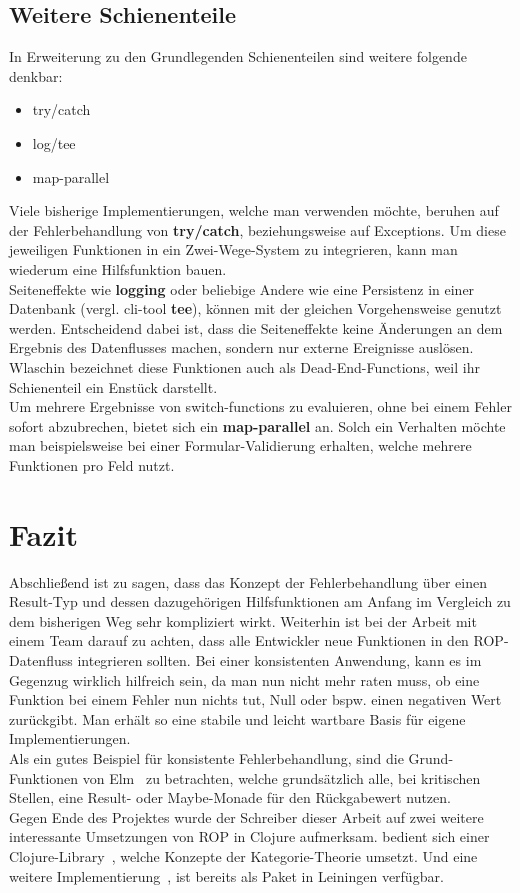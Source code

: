 \documentclass[10pt,journal,compsoc]{IEEEtran}
\begin{document}
  \subsection{Weitere Schienenteile}
  In Erweiterung zu den Grundlegenden Schienenteilen sind weitere folgende denkbar:
  \begin{itemize}
    \item try/catch
    \item log/tee
    \item map-parallel
  \end{itemize}
  Viele bisherige Implementierungen, welche man verwenden möchte, beruhen auf der Fehlerbehandlung von \textbf{try/catch}, beziehungsweise auf Exceptions.
  Um diese jeweiligen Funktionen in ein Zwei-Wege-System zu integrieren, kann man wiederum eine Hilfsfunktion bauen.\\
  Seiteneffekte wie \textbf{logging} oder beliebige Andere wie eine Persistenz in einer Datenbank (vergl. cli-tool \textbf{tee}), können mit der gleichen Vorgehensweise genutzt werden.
  Entscheidend dabei ist, dass die Seiteneffekte keine Änderungen an dem Ergebnis des Datenflusses machen, sondern nur externe Ereignisse auslösen.
  Wlaschin bezeichnet diese Funktionen auch als Dead-End-Functions, weil ihr Schienenteil ein Enstück darstellt.\\
  Um mehrere Ergebnisse von switch-functions zu evaluieren, ohne bei einem Fehler sofort abzubrechen, bietet sich ein \textbf{map-parallel} an.
  Solch ein Verhalten möchte man beispielsweise bei einer Formular-Validierung erhalten, welche mehrere Funktionen pro Feld nutzt.

  \section{Fazit}
  Abschließend ist zu sagen, dass das Konzept der Fehlerbehandlung über einen Result-Typ und dessen dazugehörigen Hilfsfunktionen am Anfang im Vergleich zu dem bisherigen Weg sehr kompliziert wirkt.
  Weiterhin ist bei der Arbeit mit einem Team darauf zu achten, dass alle Entwickler neue Funktionen in den ROP-Datenfluss integrieren sollten.
  Bei einer konsistenten Anwendung, kann es im Gegenzug wirklich hilfreich sein, da man nun nicht mehr raten muss, ob eine Funktion bei einem Fehler nun nichts tut, Null oder bspw. einen negativen Wert zurückgibt.
  Man erhält so eine stabile und leicht wartbare Basis für eigene Implementierungen.\\
  Als ein gutes Beispiel für konsistente Fehlerbehandlung, sind die Grund-Funktionen von Elm~\cite{elm} zu betrachten, welche grundsätzlich alle, bei kritischen Stellen, eine Result- oder Maybe-Monade für den Rückgabewert nutzen.\\
  Gegen Ende des Projektes wurde der Schreiber dieser Arbeit auf zwei weitere interessante Umsetzungen von ROP in Clojure aufmerksam. \cite{otherrop} bedient sich einer Clojure-Library~\cite{clojurecats}, welche Konzepte der Kategorie-Theorie umsetzt.
  Und eine weitere Implementierung~\cite{otherrop2}, ist bereits als Paket in Leiningen verfügbar.
\end{document}
